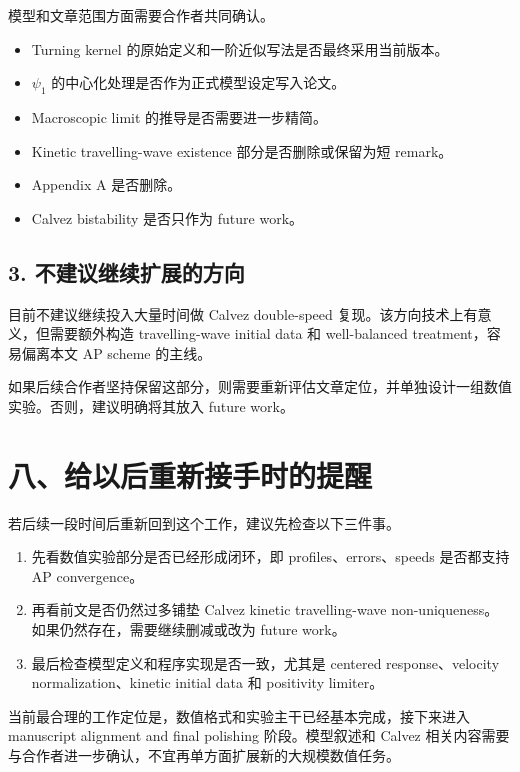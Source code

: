 \documentclass[11pt]{ctexart}
\begin{document}
模型和文章范围方面需要合作者共同确认。

\begin{itemize}[leftmargin=2em]
    \item Turning kernel 的原始定义和一阶近似写法是否最终采用当前版本。
    \item \(\psi_1\) 的中心化处理是否作为正式模型设定写入论文。
    \item Macroscopic limit 的推导是否需要进一步精简。
    \item Kinetic travelling-wave existence 部分是否删除或保留为短 remark。
    \item Appendix A 是否删除。
    \item Calvez bistability 是否只作为 future work。
\end{itemize}

\subsection*{3. 不建议继续扩展的方向}

目前不建议继续投入大量时间做 Calvez double-speed 复现。该方向技术上有意义，但需要额外构造 travelling-wave initial data 和 well-balanced treatment，容易偏离本文 AP scheme 的主线。

如果后续合作者坚持保留这部分，则需要重新评估文章定位，并单独设计一组数值实验。否则，建议明确将其放入 future work。

\section*{八、给以后重新接手时的提醒}

若后续一段时间后重新回到这个工作，建议先检查以下三件事。

\begin{enumerate}[leftmargin=2em]
    \item 先看数值实验部分是否已经形成闭环，即 profiles、errors、speeds 是否都支持 AP convergence。
    \item 再看前文是否仍然过多铺垫 Calvez kinetic travelling-wave non-uniqueness。如果仍然存在，需要继续删减或改为 future work。
    \item 最后检查模型定义和程序实现是否一致，尤其是 centered response、velocity normalization、kinetic initial data 和 positivity limiter。
\end{enumerate}

当前最合理的工作定位是，数值格式和实验主干已经基本完成，接下来进入 manuscript alignment and final polishing 阶段。模型叙述和 Calvez 相关内容需要与合作者进一步确认，不宜再单方面扩展新的大规模数值任务。
\end{document}
